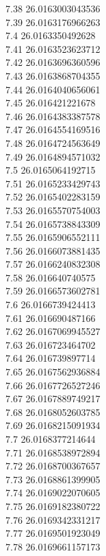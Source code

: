 {7.38	26.0163003043536\\
7.39	26.0163176966263\\
7.4	26.0163350492628\\
7.41	26.0163523623712\\
7.42	26.0163696360596\\
7.43	26.0163868704355\\
7.44	26.0164040656061\\
7.45	26.016421221678\\
7.46	26.0164383387578\\
7.47	26.0164554169516\\
7.48	26.0164724563649\\
7.49	26.0164894571032\\
7.5	26.0165064192715\\
7.51	26.0165233429743\\
7.52	26.0165402283159\\
7.53	26.0165570754003\\
7.54	26.0165738843309\\
7.55	26.0165906552111\\
7.56	26.0166073881435\\
7.57	26.0166240832308\\
7.58	26.016640740575\\
7.59	26.0166573602781\\
7.6	26.0166739424413\\
7.61	26.016690487166\\
7.62	26.0167069945527\\
7.63	26.016723464702\\
7.64	26.016739897714\\
7.65	26.0167562936884\\
7.66	26.0167726527246\\
7.67	26.0167889749217\\
7.68	26.0168052603785\\
7.69	26.0168215091934\\
7.7	26.0168377214644\\
7.71	26.0168538972894\\
7.72	26.0168700367657\\
7.73	26.0168861399905\\
7.74	26.0169022070605\\
7.75	26.0169182380722\\
7.76	26.0169342331217\\
7.77	26.0169501923049\\
7.78	26.0169661157173\\
}
